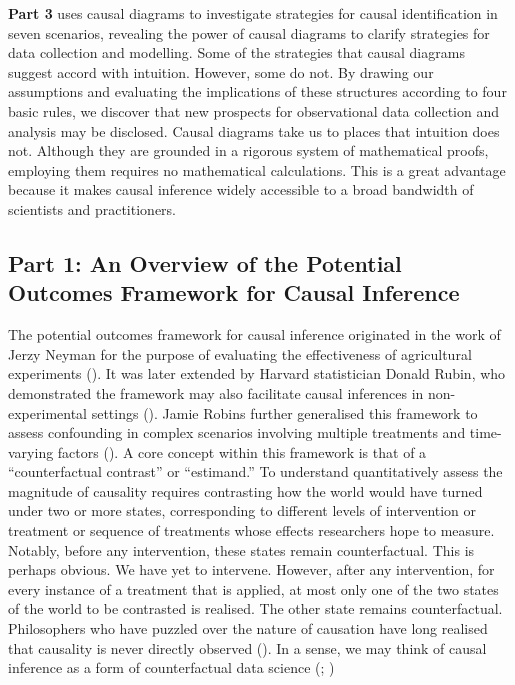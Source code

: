 \documentclass[
  singlecolumn]{article}
\begin{document}
\textbf{Part 3} uses causal diagrams to investigate strategies for
causal identification in seven scenarios, revealing the power of causal
diagrams to clarify strategies for data collection and modelling. Some
of the strategies that causal diagrams suggest accord with intuition.
However, some do not. By drawing our assumptions and evaluating the
implications of these structures according to four basic rules, we
discover that new prospects for observational data collection and
analysis may be disclosed. Causal diagrams take us to places that
intuition does not. Although they are grounded in a rigorous system of
mathematical proofs, employing them requires no mathematical
calculations. This is a great advantage because it makes causal
inference widely accessible to a broad bandwidth of scientists and
practitioners.

\subsection{Part 1: An Overview of the Potential Outcomes Framework for
Causal
Inference}\label{part-1-an-overview-of-the-potential-outcomes-framework-for-causal-inference}

The potential outcomes framework for causal inference originated in the
work of Jerzy Neyman for the purpose of evaluating the effectiveness of
agricultural experiments (). It
was later extended by Harvard statistician Donald Rubin, who
demonstrated the framework may also facilitate causal inferences in
non-experimental settings (). Jamie
Robins further generalised this framework to assess confounding in
complex scenarios involving multiple treatments and time-varying factors
(). A core concept within this
framework is that of a ``counterfactual contrast'' or ``estimand.'' To
understand quantitatively assess the magnitude of causality requires
contrasting how the world would have turned under two or more states,
corresponding to different levels of intervention or treatment or
sequence of treatments whose effects researchers hope to measure.
Notably, before any intervention, these states remain counterfactual.
This is perhaps obvious. We have yet to intervene. However, after any
intervention, for every instance of a treatment that is applied, at most
only one of the two states of the world to be contrasted is realised.
The other state remains counterfactual. Philosophers who have puzzled
over the nature of causation have long realised that causality is never
directly observed (). In a sense, we
may think of causal inference as a form of counterfactual data science
(;
)
\end{document}
